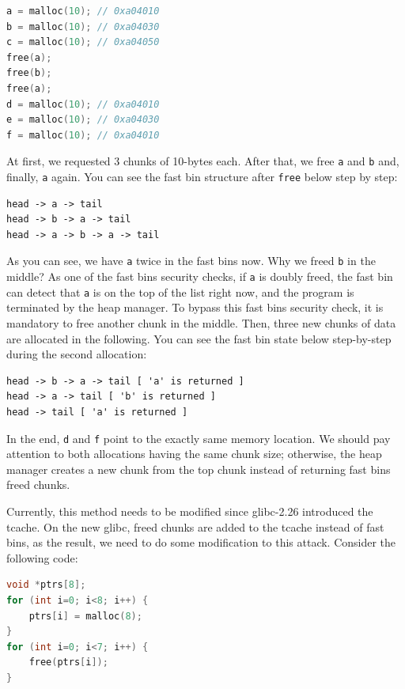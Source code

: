 \documentclass{masterthesis}
\newcommand*\libc{glibc}
\newcommand*\tch{tcache}
\newcommand*\fb{fast bins}
\begin{document}
\begin{lstlisting}[language=c,frame=tlrb]
a = malloc(10); // 0xa04010
b = malloc(10); // 0xa04030
c = malloc(10); // 0xa04050
free(a);
free(b);
free(a);
d = malloc(10); // 0xa04010
e = malloc(10); // 0xa04030
f = malloc(10); // 0xa04010
\end{lstlisting}

At first, we requested 3 chunks of 10-bytes each. After that, we free \lstinline{a} and \lstinline{b} and, finally, \lstinline{a} again. You can see the fast bin structure after \lstinline{free} below step by step:

\begin{lstlisting}[frame=tlrb]
head -> a -> tail
head -> b -> a -> tail
head -> a -> b -> a -> tail
\end{lstlisting}

As you can see, we have \lstinline{a} twice in the \fb{} now.
Why we freed \lstinline{b} in the middle? As one of the \fb{} security checks, if \lstinline{a} is doubly freed, the fast bin can detect that \lstinline{a} is on the top of the list right now, and the program is terminated by the heap manager. To bypass this \fb{} security check, it is mandatory to free another chunk in the middle. Then, three new chunks of data are allocated in the following. You can see the fast bin state below step-by-step during the second allocation:

\begin{lstlisting}[frame=tlrb]
head -> b -> a -> tail [ 'a' is returned ]
head -> a -> tail [ 'b' is returned ]
head -> tail [ 'a' is returned ]
\end{lstlisting}

In the end, \lstinline{d} and \lstinline{f} point to the exactly same memory location. We should pay attention to both allocations having the same chunk size; otherwise, the heap manager creates a new chunk from the top chunk instead of returning \fb{} freed chunks.

Currently, this method needs to be modified since \libc{-2.26} introduced the \tch{}. On the new \libc{}, freed chunks are added to the \tch{} instead of \fb{}, as the result, we need to do some modification to this attack. Consider the following code:

\begin{lstlisting}[language=c,frame=tlrb]
void *ptrs[8];
for (int i=0; i<8; i++) {
	ptrs[i] = malloc(8);
}
for (int i=0; i<7; i++) {
	free(ptrs[i]);
}
\end{lstlisting}
\end{document}
